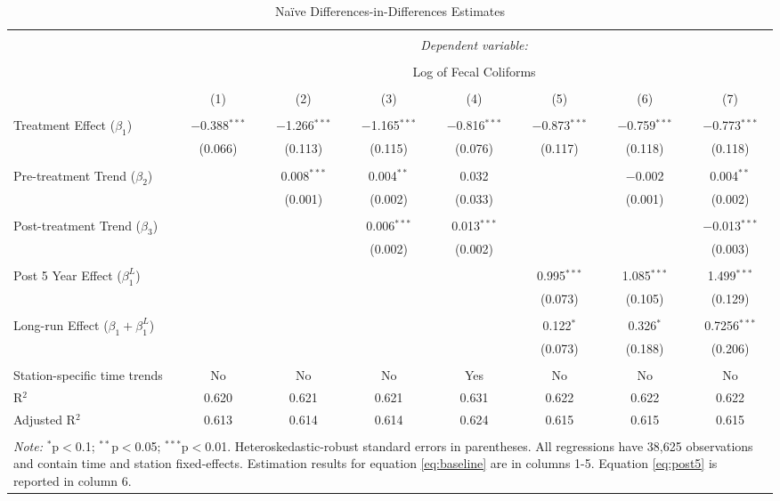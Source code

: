 \documentclass[12pt]{article}
\begin{document}
\begin{sidewaystable}[ph!] \centering \footnotesize
  \caption{Na\"{i}ve Differences-in-Differences Estimates} 
  \label{tab:1} 
\begin{tabular}{@{\extracolsep{5pt}}lccccccc} 
\\[-1.8ex]\hline 
\hline \\[-1.8ex] 
 & \multicolumn{7}{c}{\textit{Dependent variable:}} \\ 
\cline{2-8} 
\\[-1.8ex] & \multicolumn{7}{c}{Log of Fecal Coliforms} \\ 
\\[-1.8ex] & (1) & (2) & (3) & (4) & (5) & (6) & (7)\\ 
\hline \\[-1.8ex] 
 Treatment Effect ($\beta_1$) & $-$0.388$^{***}$ & $-$1.266$^{***}$ & $-$1.165$^{***}$ & $-$0.816$^{***}$ & $-$0.873$^{***}$ & $-$0.759$^{***}$ & $-$0.773$^{***}$ \\ 
  & (0.066) & (0.113) & (0.115) & (0.076) & (0.117) & (0.118) & (0.118) \\ 
  & & & & & & & \\ 
Pre-treatment Trend ($\beta_2$) &  & 0.008$^{***}$ & 0.004$^{**}$ & 0.032 &  & $-$0.002 & 0.004$^{**}$ \\ 
  &  & (0.001) & (0.002) & (0.033) & & (0.001) & (0.002) \\ 
  & & & & & & & \\ 
Post-treatment Trend ($\beta_3$) &  &  & 0.006$^{***}$ & 0.013$^{***}$ & &  & $-$0.013$^{***}$ \\ 
  &  &  & (0.002) & (0.002) & &  & (0.003) \\ 
  & & & & & & \\ 
 Post 5 Year Effect ($\beta^L_1$) & & &  &  & 0.995$^{***}$ & 1.085$^{***}$ & 1.499$^{***}$ \\ 
  &  &  & & & (0.073) & (0.105) & (0.129) \\ 
  & & & & & & & \\ 
Long-run Effect ($\beta_1 + \beta_1^L$) & & &  &  & 0.122$^*$ & 0.326$^*$ & 0.7256$^{***}$ \\ 
 & &  &  &  & (0.073) & (0.188) & (0.206) \\ 
\hline \\[-1.8ex] 
Station-specific time trends & No & No & No & Yes & No & No & No \\
R$^{2}$ & 0.620 & 0.621 & 0.621 & 0.631 & 0.622 & 0.622 & 0.622 \\ 
Adjusted R$^{2}$ & 0.613 & 0.614 & 0.614 & 0.624 & 0.615 & 0.615 & 0.615 \\  
\hline
\hline \\[-1.8ex] 
\multicolumn{8}{p{.9\textwidth}}{\footnotesize{\textit{Note:} $^{*}$p$<$0.1; $^{**}$p$<$0.05; $^{***}$p$<$0.01. Heteroskedastic-robust standard errors in parentheses. All regressions have 38,625 observations and contain time and station fixed-effects. Estimation results for equation \eqref{eq:baseline} are in columns 1-5. Equation \eqref{eq:post5} is reported in column 6.} }
\end{tabular} 
\end{sidewaystable} 
\end{document}
